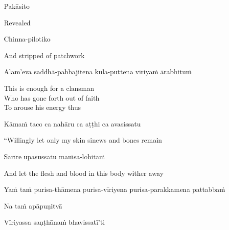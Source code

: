 Pakāsito

\begin{english}
  Revealed
\end{english}

Chinna-pilotiko

\begin{english}
  And stripped of patchwork
\end{english}

\begin{pali-hang}
Alam'eva saddhā-pabbajitena kula-puttena vīriyaṁ ārabhituṁ
\end{pali-hang}

\ifninebythirteen\clearpage\fi

\begin{english-verses}
  This is enough for a clansman\\
  Who has gone forth out of faith\\
  To arouse his energy thus
\end{english-verses}

Kāmaṁ taco ca nahāru ca aṭṭhi ca avasissatu

\begin{english}
  ``Willingly let only my skin  sinews  and bones remain
\end{english}

Sarīre upasussatu maṁsa-lohitaṁ

\begin{english}
  And let the flesh and blood in this body wither away
\end{english}

\ifbfive\clearpage\fi
\ifafive\clearpage\fi

\begin{pali-hang}
  Yaṁ taṁ purisa-thāmena purisa-vīriyena purisa-parakkamena pattabbaṁ\\
\end{pali-hang}
\begin{pali-hang-together}
  Na taṁ apāpuṇitvā\\
\end{pali-hang-together}
\begin{pali-hang-together}
  Vīriyassa saṇṭhānaṁ bhavissatī'ti
\end{pali-hang-together}

